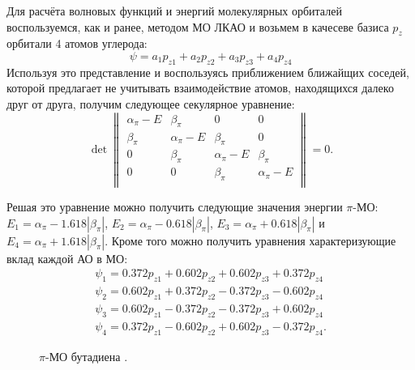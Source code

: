 Для расчёта волновых функций и энергий молекулярных орбиталей воспользуемся, как и ранее, методом МО ЛКАО и возьмем в качесеве базиса $p_z$ орбитали 4 атомов углерода:
\begin{equation}
\label{eq:piLCAO}
\psi=a_1p_{z1}+a_2p_{z2}+a_3p_{z3}+a_4p_{z4}
\end{equation}
Используя это представление и воспользуясь приближением ближайщих соседей, которой предлагает не учитывать взаимодействие атомов, находящихся далеко друг от друга, получим следующее секулярное уравнение:
\begin{equation}
\label{eq:seculMatrixPi}
\det 
\begin{Vmatrix}
\alpha_\pi-E & \beta_\pi & 0 & 0 \\
\beta_\pi  &\alpha_\pi-E & \beta_\pi  & 0 \\
0 &\beta_\pi  &\alpha_\pi-E & \beta_\pi  \\
0 & 0 &\beta_\pi  &\alpha_\pi-E \\
\end{Vmatrix}=0.
\end{equation}

Решая это уравнение можно получить следующие значения энергии $\pi$-МО: 
$E_1=\alpha_\pi-1.618|\beta_\pi|$, $E_2=\alpha_\pi-0.618|\beta_\pi|$, $E_3=\alpha_\pi+0.618|\beta_\pi|$ и  $E_4=\alpha_\pi+1.618|\beta_\pi|$. 
Кроме того можно получить уравнения характеризующие вклад каждой АО в МО:
\begin{eqnarray*}
\psi_1=0.372p_{z1}+0.602p_{z2}+0.602p_{z3}+0.372p_{z4}\\
\psi_2=0.602p_{z1}+0.372p_{z2}-0.372p_{z3}-0.602p_{z4}\\
\psi_3=0.602p_{z1}-0.372p_{z2}-0.372p_{z3}+0.602p_{z4}\\
\psi_4=0.372p_{z1}-0.602p_{z2}+0.602p_{z3}-0.372p_{z4}.
\end{eqnarray*}

\begin{figure}
\caption{$\pi$-МО бутадиена \cite{dyachkov2011}.}
\label{fig:MOButadien}
\end{figure}

